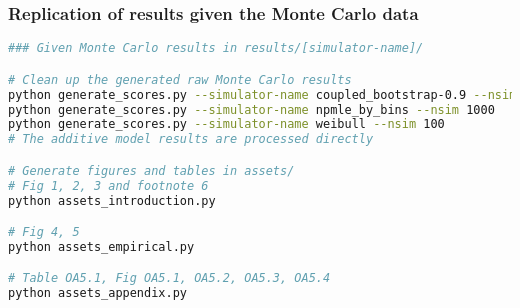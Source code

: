 \documentclass[10pt]{article}
\providecommand{\tightlist}{%
  \setlength{\itemsep}{0pt}\setlength{\parskip}{0pt}}
\begin{document}
\subsubsection*{Replication of results given the Monte Carlo data}

\begin{lstlisting}[language=bash]
### Given Monte Carlo results in results/[simulator-name]/

# Clean up the generated raw Monte Carlo results
python generate_scores.py --simulator-name coupled_bootstrap-0.9 --nsim 1000
python generate_scores.py --simulator-name npmle_by_bins --nsim 1000
python generate_scores.py --simulator-name weibull --nsim 100
# The additive model results are processed directly

# Generate figures and tables in assets/
# Fig 1, 2, 3 and footnote 6
python assets_introduction.py

# Fig 4, 5
python assets_empirical.py

# Table OA5.1, Fig OA5.1, OA5.2, OA5.3, OA5.4
python assets_appendix.py
\end{lstlisting}


\end{document}
